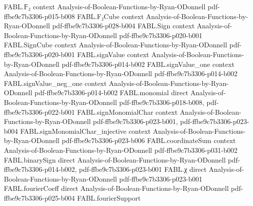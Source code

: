 \begin{theorem}
\label{FABL.averageDecisionTreeComplexity_recursiveMajority_three_le}
\leanok
{}
\proofstep
  {FABL.𝔽₂}
  {context}
  {Analysis-of-Boolean-Functions-by-Ryan-ODonnell}
  {pdf-ffbe9c7b3306-p015-b008}
\proofstep
  {FABL.F₂Cube}
  {context}
  {Analysis-of-Boolean-Functions-by-Ryan-ODonnell}
  {pdf-ffbe9c7b3306-p028-b004}
\proofstep
  {FABL.Sign}
  {context}
  {Analysis-of-Boolean-Functions-by-Ryan-ODonnell}
  {pdf-ffbe9c7b3306-p020-b001}
\proofstep
  {FABL.SignCube}
  {context}
  {Analysis-of-Boolean-Functions-by-Ryan-ODonnell}
  {pdf-ffbe9c7b3306-p020-b001}
\proofstep
  {FABL.signValue}
  {context}
  {Analysis-of-Boolean-Functions-by-Ryan-ODonnell}
  {pdf-ffbe9c7b3306-p014-b002}
\proofstep
  {FABL.signValue_one}
  {context}
  {Analysis-of-Boolean-Functions-by-Ryan-ODonnell}
  {pdf-ffbe9c7b3306-p014-b002}
\proofstep
  {FABL.signValue_neg_one}
  {context}
  {Analysis-of-Boolean-Functions-by-Ryan-ODonnell}
  {pdf-ffbe9c7b3306-p014-b002}
\proofstep
  {FABL.monomial}
  {direct}
  {Analysis-of-Boolean-Functions-by-Ryan-ODonnell}
  {pdf-ffbe9c7b3306-p018-b008,
    pdf-ffbe9c7b3306-p022-b001}
\proofstep
  {FABL.signMonomialChar}
  {context}
  {Analysis-of-Boolean-Functions-by-Ryan-ODonnell}
  {pdf-ffbe9c7b3306-p023-b001,
    pdf-ffbe9c7b3306-p023-b004}
\proofstep
  {FABL.signMonomialChar_injective}
  {context}
  {Analysis-of-Boolean-Functions-by-Ryan-ODonnell}
  {pdf-ffbe9c7b3306-p023-b006}
\proofstep
  {FABL.coordinateSum}
  {context}
  {Analysis-of-Boolean-Functions-by-Ryan-ODonnell}
  {pdf-ffbe9c7b3306-p031-b002}
\proofstep
  {FABL.binarySign}
  {direct}
  {Analysis-of-Boolean-Functions-by-Ryan-ODonnell}
  {pdf-ffbe9c7b3306-p014-b002,
    pdf-ffbe9c7b3306-p023-b001}
\proofstep
  {FABL.χ}
  {direct}
  {Analysis-of-Boolean-Functions-by-Ryan-ODonnell}
  {pdf-ffbe9c7b3306-p023-b001}
\proofstep
  {FABL.fourierCoeff}
  {direct}
  {Analysis-of-Boolean-Functions-by-Ryan-ODonnell}
  {pdf-ffbe9c7b3306-p025-b004}
\proofstep
  {FABL.fourierSupport}

\end{theorem}

